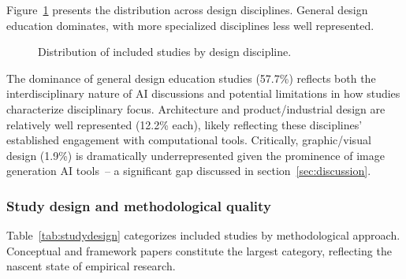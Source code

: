 \documentclass[ed]{acnsart}
\begin{document}
Figure~\ref{fig:disciplines} presents the distribution across design disciplines. General design education dominates, with more specialized disciplines less well represented.

\begin{figure}[htbp]
\centering
{}
\caption{Distribution of included studies by design discipline.}
\label{fig:disciplines}
\end{figure}

The dominance of general design education studies (57.7\%) reflects both the interdisciplinary nature of AI discussions and potential limitations in how studies characterize disciplinary focus. Architecture and product/industrial design are relatively well represented (12.2\% each), likely reflecting these disciplines' established engagement with computational tools. Critically, graphic/visual design (1.9\%) is dramatically underrepresented given the prominence of image generation AI tools~-- a significant gap discussed in section~\ref{sec:discussion}.

\subsubsection{Study design and methodological quality}

Table~\ref{tab:studydesign} categorizes included studies by methodological approach. Conceptual and framework papers constitute the largest category, reflecting the nascent state of empirical research.
\end{document}
